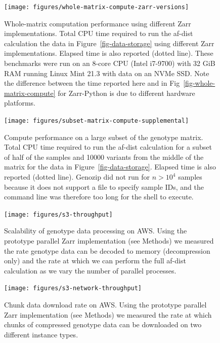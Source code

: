 \documentclass[a4paper,num-refs]{oup-contemporary}
\begin{document}
\begin{figure}[h]
\texttt{[image: figures/whole-matrix-compute-zarr-versions]}
\caption{Whole-matrix computation performance using different Zarr
implementations.
Total CPU time required to run the af-dist calculation
the data in Figure~\ref{fig-data-storage} using different Zarr implementations.
Elapsed time is also reported (dotted line).
These benchmarks were run on an 8-core CPU (Intel i7-9700) with 32 GiB RAM running
Linux Mint 21.3 with data on an NVMe SSD.
Note the difference between the
time reported here and in Fig~\ref{fig-whole-matrix-compute} for Zarr-Python
is due to different hardware platforms.
\label{fig-whole-matrix-compute-zarr-versions}}
\end{figure}

\begin{figure}[h]
\texttt{[image: figures/subset-matrix-compute-supplemental]}
\caption{Compute performance on a large subset of the genotype matrix.
Total CPU time required to run the af-dist calculation for
a subset of half of the samples and 10000 variants from the middle of the matrix
for the data in Figure~\ref{fig-data-storage}.
Elapsed time is also reported (dotted line).
Genozip did not run for
$n > 10^4$ samples because it does not support a file to specify
sample IDs, and the command line was therefore too long for the shell
to execute.
\label{fig-subset-matrix-compute-supplemental}}
\end{figure}

\begin{figure}[h]
\texttt{[image: figures/s3-throughput]}
\caption{Scalability of genotype data processing on AWS.
Using the prototype parallel Zarr implementation (see Methods) we 
measured the rate genotype data can be decoded to memory (decompression
only) and the rate at which we can perform the full af-dist
calculation as we vary the number of parallel processes.
\label{fig-s3-throughput}}
\end{figure}

\begin{figure}[h]
\texttt{[image: figures/s3-network-throughput]}
\caption{Chunk data download rate on AWS.
Using the prototype parallel Zarr implementation (see Methods) we 
measured the rate at which chunks of compressed genotype data 
can be downloaded on two different instance types.
\label{fig-s3-network-throughput}}
\end{figure}
\end{document}
